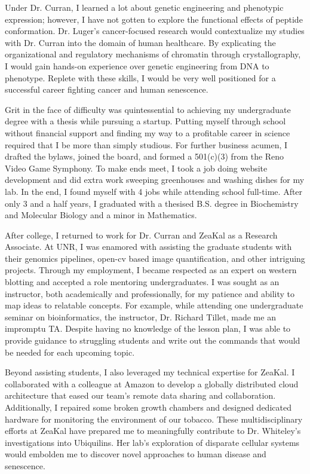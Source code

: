 \documentclass[12pt]{article}
\begin{document}
Under Dr. Curran, I learned a lot about genetic engineering and phenotypic expression; however, I have not gotten to explore the functional effects of peptide conformation. Dr. Luger's cancer-focused research would contextualize my studies with Dr. Curran into the domain of human healthcare. By explicating the organizational and regulatory mechanisms of chromatin through crystallography, I would gain hands-on experience over genetic engineering from DNA to phenotype. Replete with these skills, I would be very well positioned for a successful career fighting cancer and human senescence.

Grit in the face of difficulty was quintessential to achieving my undergraduate degree with a thesis while pursuing a startup. Putting myself through school without financial support and finding my way to a profitable career in science required that I be more than simply studious. For further business acumen, I drafted the bylaws, joined the board, and formed a 501(c)(3) from the Reno Video Game Symphony. To make ends meet, I took a job doing website development and did extra work sweeping greenhouses and washing dishes for my lab. In the end, I found myself with 4 jobs while attending school full-time. After only 3 and a half years, I graduated with a thesised B.S. degree in Biochemistry and Molecular Biology and a minor in Mathematics.

After college, I returned to work for Dr. Curran and ZeaKal as a Research Associate. At UNR, I was enamored with assisting the graduate students with their genomics pipelines, open-cv based image quantification, and other intriguing projects. Through my employment, I became respected as an expert on western blotting and accepted a role mentoring undergraduates. I was sought as an instructor, both academically and professionally, for my patience and ability to map ideas to relatable concepts. For example, while attending one undergraduate seminar on bioinformatics, the instructor, Dr. Richard Tillet, made me an impromptu TA. Despite having no knowledge of the lesson plan, I was able to provide guidance to struggling students and write out the commands that would be needed for each upcoming topic.

Beyond assisting students, I also leveraged my technical expertise for ZeaKal. I collaborated with a colleague at Amazon to develop a globally distributed cloud architecture that eased our team's remote data sharing and collaboration. Additionally, I repaired some broken growth chambers and designed dedicated hardware for monitoring the environment of our tobacco. These multidisciplinary efforts at ZeaKal have prepared me to meaningfully contribute to Dr. Whiteley's investigations into Ubiquilins. Her lab's exploration of disparate cellular systems would embolden me to discover novel approaches to human disease and senescence.
\end{document}
